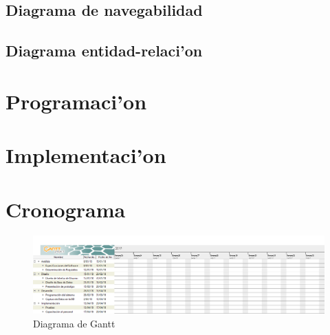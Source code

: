\subsection{Diagrama de navegabilidad}

\subsection{Diagrama entidad-relaci'on}

\section{Programaci'on}

\section{Implementaci'on}

\section{Cronograma}
\begin{center}
\begin{figure}[H]
\includegraphics[scale=0.3]{img/gant.jpg} 
\caption{Diagrama de Gantt}
\end{figure}
\end{center}

